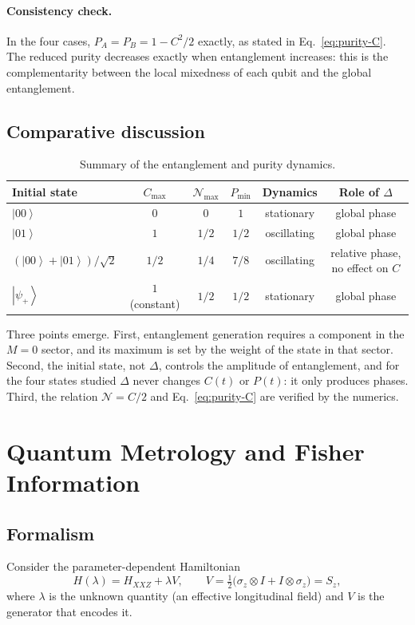 \documentclass[11pt,a4paper]{article}
\newcommand{\ket}[1]{\left|#1\right\rangle}
\begin{document}
\paragraph{Consistency check.}
In the four cases, $P_A=P_B=1-C^2/2$ exactly, as stated in Eq.~\eqref{eq:purity-C}. The reduced purity decreases exactly when entanglement increases: this is the complementarity between the local mixedness of each qubit and the global entanglement.

\subsection{Comparative discussion}
\begin{table}[htbp]
  \centering
  \begin{tabular}{@{}lccccc@{}}
    \toprule
    Initial state & $C_{\max}$ & $\mathcal N_{\max}$ & $P_{\min}$ & Dynamics & Role of $\Delta$\\
    \midrule
    $\ket{00}$ & $0$ & $0$ & $1$ & stationary & global phase\\
    $\ket{01}$ & $1$ & $1/2$ & $1/2$ & oscillating & global phase\\
    $(\ket{00}+\ket{01})/\sqrt2$ & $1/2$ & $1/4$ & $7/8$ & oscillating & relative phase, no effect on $C$\\
    $\ket{\psi_+}$ & $1$ (constant) & $1/2$ & $1/2$ & stationary & global phase\\
    \bottomrule
  \end{tabular}
  \caption{Summary of the entanglement and purity dynamics.}
\end{table}

Three points emerge. First, entanglement generation requires a component in the $M=0$ sector, and its maximum is set by the weight of the state in that sector. Second, the initial state, not $\Delta$, controls the amplitude of entanglement, and for the four states studied $\Delta$ never changes $C(t)$ or $P(t)$: it only produces phases. Third, the relation $\mathcal N=C/2$ and Eq.~\eqref{eq:purity-C} are verified by the numerics.

\section{Quantum Metrology and Fisher Information}\label{sec:metrology}

\subsection{Formalism}
Consider the parameter-dependent Hamiltonian
\begin{equation}
  H(\lambda)=H_{XXZ}+\lambda V,\qquad V=\tfrac12\bigl(\sigma_z\otimes I+I\otimes\sigma_z\bigr)=S_z,
\end{equation}
where $\lambda$ is the unknown quantity (an effective longitudinal field) and $V$ is the generator that encodes it.
\end{document}
